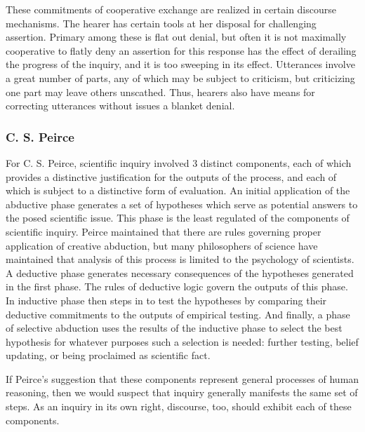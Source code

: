 \documentclass[letterpaper,]{article}
\begin{document}
These commitments of cooperative exchange are realized in certain
discourse mechanisms. The hearer has certain tools at her disposal for
challenging assertion. Primary among these is flat out denial, but often
it is not maximally cooperative to flatly deny an assertion for this
response has the effect of derailing the progress of the inquiry, and it
is too sweeping in its effect. Utterances involve a great number of
parts, any of which may be subject to criticism, but criticizing one
part may leave others unscathed. Thus, hearers also have means for
correcting utterances without issues a blanket denial.

\subsubsection{C. S. Peirce}\label{peirce}

For C. S. Peirce, scientific inquiry involved 3 distinct components,
each of which provides a distinctive justification for the outputs of
the process, and each of which is subject to a distinctive form of
evaluation. An initial application of the abductive phase generates a
set of hypotheses which serve as potential answers to the posed
scientific issue. This phase is the least regulated of the components of
scientific inquiry. Peirce maintained that there are rules governing
proper application of creative abduction, but many philosophers of
science have maintained that analysis of this process is limited to the
psychology of scientists. A deductive phase generates necessary
consequences of the hypotheses generated in the first phase. The rules
of deductive logic govern the outputs of this phase. In inductive phase
then steps in to test the hypotheses by comparing their deductive
commitments to the outputs of empirical testing. And finally, a phase of
selective abduction uses the results of the inductive phase to select
the best hypothesis for whatever purposes such a selection is needed:
further testing, belief updating, or being proclaimed as scientific
fact.

If Peirce's suggestion that these components represent general processes
of human reasoning, then we would suspect that inquiry generally
manifests the same set of steps. As an inquiry in its own right,
discourse, too, should exhibit each of these components.

\end{document}
